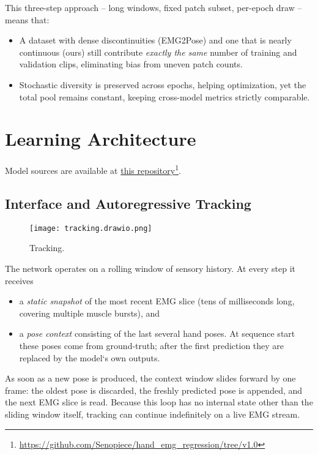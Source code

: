 This three-step approach -- long windows, fixed patch subset, per-epoch draw -- means that:

\begin{itemize}
  \item A dataset with dense discontinuities (EMG2Pose) and one that is
        nearly continuous (ours) still contribute \emph{exactly the same}
        number of training and validation clips, eliminating bias from
        uneven patch counts.
  \item Stochastic diversity is preserved across epochs, helping optimization,
        yet the total pool remains constant, keeping cross-model metrics
        strictly comparable.
\end{itemize}

\section{Learning Architecture}

Model sources are available at \href{https://github.com/Senopiece/hand_emg_regression/tree/v1.0}{this repository}\footnote{\url{https://github.com/Senopiece/hand_emg_regression/tree/v1.0}}.

\subsection{Interface and Autoregressive Tracking}

\begin{figure}[H]
    \centering
    \texttt{[image: tracking.drawio.png]}
    \caption{Tracking.}
    \label{fig:tracking}
\end{figure}

The network operates on a rolling window of sensory history.
At every step it receives

\begin{itemize}
  \item a \emph{static snapshot} of the most recent EMG slice
        (tens of milliseconds long, covering multiple muscle bursts), and
  \item a \emph{pose context} consisting of the last several hand poses.
        At sequence start these poses come from ground-truth; after the first
        prediction they are replaced by the model`s own outputs.
\end{itemize}

As soon as a new pose is produced, the context window slides forward by one frame: the oldest pose is discarded, the freshly predicted pose is appended, and the next EMG slice is read. Because this loop has no internal state other than the sliding window itself, tracking can continue indefinitely on a live EMG stream.

